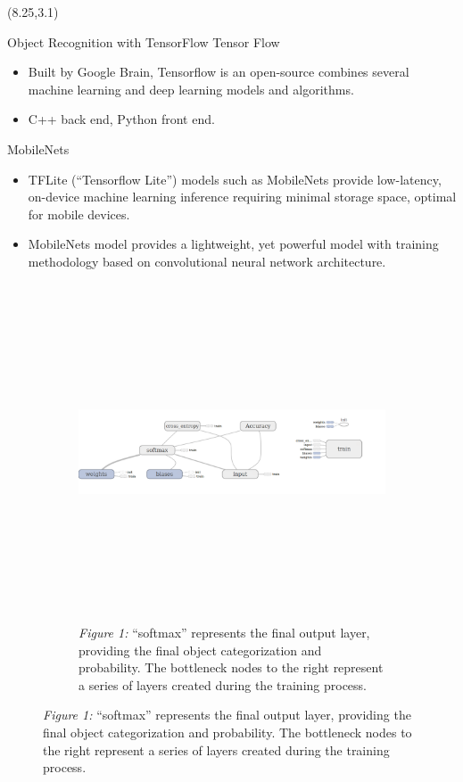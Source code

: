 \documentclass[22pt]{beamer}
\begin{document}
\begin{frame}[fragile]
\begin{textblock}{7.25}(8.25,3.1)
\begin{block}{Object Recognition with TensorFlow}
Tensor Flow
\begin{itemize}
\item Built by Google Brain, Tensorflow is an open-source combines several machine learning and deep learning models and algorithms.
\item C++ back end, Python front end.
\end{itemize}
MobileNets
\begin{itemize}
\item TFLite (“Tensorflow Lite”) models such as MobileNets provide low-latency, on-device machine learning inference requiring minimal storage space, optimal for mobile devices. 
\item MobileNets model provides a lightweight, yet powerful model with training methodology based on convolutional neural network architecture.
\end{itemize}
\begin{figure}[htbp] %
\begin{subfigure}{0.95\textwidth}
   \centering
   \includegraphics[height=10cm]{softmax.png}
   \caption*{\textit{Figure 1:} “softmax” represents the final output layer, providing the final object categorization and probability. The bottleneck nodes to the right represent a series of layers created during the training process.}
   \label{fig:softmax}
\end{subfigure}
\end{figure}

\end{block}
\end{textblock}
\end{frame}
\end{document}
